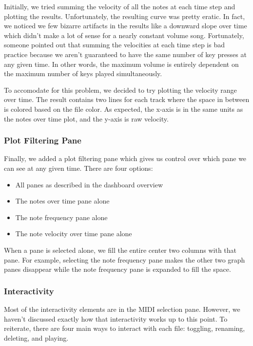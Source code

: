 \documentclass[journal]{vgtc}                %
\begin{document}
Initially, we tried summing the velocity of all the notes at each time step and
plotting the results. Unfortunately, the resulting curve was pretty eratic. In
fact, we noticed we few bizarre artifacts in the results like a downward
slope over time which didn't make a lot of sense for a nearly constant
volume song. Fortunately, someone pointed out that summing the velocities at
each time step is bad practice because we aren't guaranteed to have the same
number of key presses at any given time. In other words, the maximum volume
is entirely dependent on the maximum number of keys played simultaneously.

To accomodate for this problem, we decided to try plotting the velocity range
over time. The result contains two lines for each track where the space in
between is colored based on the file color. As expected, the x-axis is in the
same units as the notes over time plot, and the y-axis is raw velocity.

\subsubsection{Plot Filtering Pane}

Finally, we added a plot filtering pane which gives us control over which pane
we can see at any given time. There are four options:

\begin{itemize}
  \item All panes as described in the dashboard overview
  \item The notes over time pane alone
  \item The note frequency pane alone
  \item The note velocity over time pane alone
\end{itemize}

When a pane is selected alone, we fill the entire center two columns with that
pane. For example, selecting the note frequency pane makes the other two graph
panes disappear while the note frequency pane is expanded to fill the space.

\subsubsection{Interactivity}

Most of the interactivity elements are in the MIDI selection pane. However, we
haven't discussed exactly how that interactivity works up to this point. To
reiterate, there are four main ways to interact with each file: toggling,
renaming, deleting, and playing.
\end{document}
